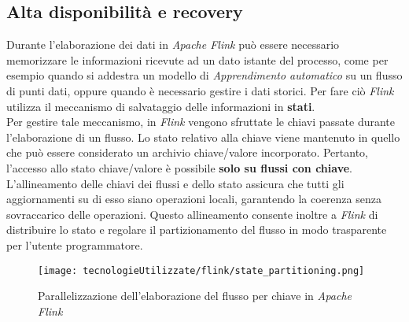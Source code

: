 \subsection{Alta disponibilità e recovery}
Durante l'elaborazione dei dati in \textit{Apache Flink} può essere necessario memorizzare le informazioni ricevute ad un dato istante del processo, come per esempio quando si addestra un modello di \textit{\gls{Apprendimento automatico}} su un flusso di punti dati, oppure quando è necessario gestire i dati storici. Per fare ciò \textit{Flink} utilizza il meccanismo di salvataggio delle informazioni in \textbf{stati}.\\
Per gestire tale meccanismo, in \textit{Flink} vengono sfruttate le chiavi passate durante l'elaborazione di un flusso. Lo stato relativo alla chiave viene mantenuto in quello che può essere considerato un archivio chiave/valore incorporato. Pertanto, l'accesso allo stato chiave/valore è possibile \textbf{solo su flussi con chiave}. L'allineamento delle chiavi dei flussi e dello stato assicura che tutti gli aggiornamenti su di esso siano operazioni locali, garantendo la coerenza senza sovraccarico delle operazioni. Questo allineamento consente inoltre a \textit{Flink} di distribuire lo stato e regolare il partizionamento del flusso in modo trasparente per l'utente programmatore.

\begin{figure}[H] 
    \centering 
    \texttt{[image: tecnologieUtilizzate/flink/state\_partitioning.png]} 
    \caption{Parallelizzazione dell'elaborazione del flusso per chiave in \textit{Apache Flink}}
\end{figure}

